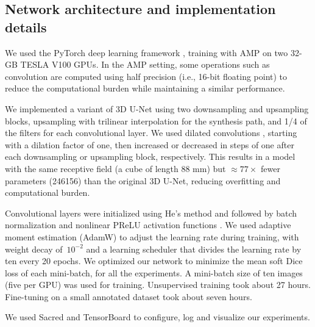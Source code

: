 \subsection{Network architecture and implementation details}

We used the PyTorch deep learning framework \cite{paszke_pytorch_2019}, training with \ac{AMP} on two 32-GB TESLA V100 \acp{GPU}.
In the \ac{AMP} setting, some operations such as convolution are computed using half precision (i.e., 16-bit floating point) to reduce the computational burden while maintaining a similar performance.

We implemented a variant of 3D U-Net \cite{cicek_3d_2016} using two downsampling and upsampling blocks, upsampling with trilinear interpolation for the synthesis path, and 1/4 of the filters for each convolutional layer.
We used dilated convolutions \cite{chen_deeplab_2017}, starting with a dilation factor of one, then increased or decreased in steps of one after each downsampling or upsampling block, respectively.
This results in a model with the same receptive field (a cube of length 88 mm) but $\approx 77 \times$ fewer parameters (\num{246156}) than the original 3D U-Net, reducing overfitting and computational burden.

Convolutional layers were initialized using He's method and followed by batch normalization and nonlinear PReLU activation functions \cite{ioffe_batch_2015,he_delving_2015}.
We used adaptive moment estimation (AdamW) \cite{kingma_adam_2014,loshchilov_decoupled_2019} to adjust the learning rate during training, with weight decay of~$10^{-2}$ and a learning scheduler that divides the learning rate by ten every 20 epochs.
We optimized our network to minimize the mean soft Dice loss \cite{milletari_v-net_2016} of each mini-batch, for all the experiments.
A mini-batch size of ten images (five per \ac{GPU}) was used for training.
Unsupervised training took about 27 hours.
Fine-tuning on a small annotated dataset took about seven hours.

We used Sacred \cite{greff_sacred_2017} and TensorBoard \cite{abadi_tensorflow_2016} to configure, log and visualize our experiments.
